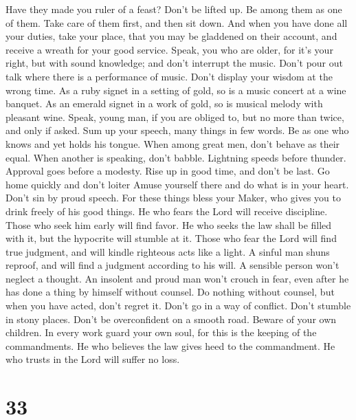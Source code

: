  Have they made you ruler of a feast? Don't be lifted up. Be
among them as one of them. Take care of them first, and then sit down.
 And when you have done all your duties, take your place,
that you may be gladdened on their account, and receive a wreath for
your good service.  Speak, you who are older, for it's your
right, but with sound knowledge; and don't interrupt the music.
 Don't pour out talk where there is a performance of music.
Don't display your wisdom at the wrong time.  As a ruby
signet in a setting of gold, so is a music concert at a wine banquet.
 As an emerald signet in a work of gold, so is musical
melody with pleasant wine.  Speak, young man, if you are
obliged to, but no more than twice, and only if asked.  Sum
up your speech, many things in few words. Be as one who knows and yet
holds his tongue.  When among great men, don't behave as
their equal. When another is speaking, don't babble. 
Lightning speeds before thunder. Approval goes before a modesty.
 Rise up in good time, and don't be last. Go home quickly
and don't loiter  Amuse yourself there and do what is in
your heart. Don't sin by proud speech.  For these things
bless your Maker, who gives you to drink freely of his good things.
 He who fears the Lord will receive discipline. Those who
seek him early will find favor.  He who seeks the law shall
be filled with it, but the hypocrite will stumble at it. 
Those who fear the Lord will find true judgment, and will kindle
righteous acts like a light.  A sinful man shuns reproof,
and will find a judgment according to his will.  A sensible
person won't neglect a thought. An insolent and proud man won't crouch
in fear, even after he has done a thing by himself without counsel.
 Do nothing without counsel, but when you have acted, don't
regret it.  Don't go in a way of conflict. Don't stumble in
stony places.  Don't be overconfident on a smooth road.
 Beware of your own children.  In every work
guard your own soul, for this is the keeping of the commandments.
 He who believes the law gives heed to the commandment. He
who trusts in the Lord will suffer no loss.

\hypertarget{section-11}{%
\section{33}\label{section-11}}


